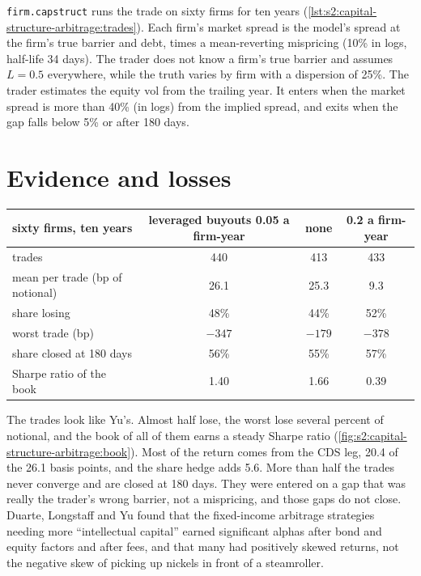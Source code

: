 \texttt{firm.capstruct} runs the trade on sixty firms for ten years (\cref{lst:s2:capital-structure-arbitrage:trades}). Each firm's market spread is
the model's spread at the firm's true barrier and debt, times a mean-reverting mispricing (10\% in logs, half-life 34 days). The trader does not know
a firm's true barrier and assumes $L = 0.5$ everywhere, while the truth varies by firm with a dispersion of 25\%. The trader estimates the equity vol
from the trailing year. It enters when the market spread is more than 40\% (in logs) from the implied spread, and exits when the gap falls below 5\%
or after 180 days.

\section{Evidence and losses}

\begin{center}
\small
\begin{tabular}{@{}lccc@{}}
\toprule
sixty firms, ten years & leveraged buyouts 0.05 a firm-year & none & 0.2 a firm-year\\
\midrule
trades & 440 & 413 & 433\\
mean per trade (bp of notional) & 26.1 & 25.3 & 9.3\\
share losing & 48\% & 44\% & 52\%\\
worst trade (bp) & $-347$ & $-179$ & $-378$\\
share closed at 180 days & 56\% & 55\% & 57\%\\
Sharpe ratio of the book & 1.40 & 1.66 & 0.39\\
\bottomrule
\end{tabular}
\end{center}

The trades look like Yu's. Almost half lose, the worst lose several percent of notional, and the book of all of them earns a steady Sharpe ratio
(\cref{fig:s2:capital-structure-arbitrage:book}). Most of the return comes from the CDS leg, 20.4 of the 26.1 basis points, and the share hedge adds
5.6. More than half the trades never converge and are closed at 180 days. They were entered on a gap that was really the trader's wrong barrier, not a
mispricing, and those gaps do not close. Duarte, Longstaff and Yu found that the fixed-income arbitrage strategies needing more ``intellectual capital''
earned significant alphas after bond and equity factors and after fees, and that many had positively skewed returns, not the negative skew of
picking up nickels in front of a steamroller.

